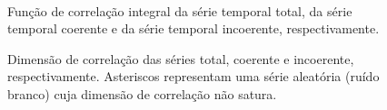 \begin{figure}[ht]
\centering {}\\ 
\caption{Função de correlação integral da série temporal total, da série temporal coerente e da série temporal incoerente, respectivamente.}
\label{figcorrinttS0681200}
\end{figure}

\begin{figure}[ht]
\centering {}
\caption{Dimensão de correlação das séries total, coerente e incoerente, respectivamente. Asteriscos representam uma série aleatória (ruído branco) cuja dimensão de correlação não satura.}
\label{figdimcorreltcitS0681200}
\end{figure}

